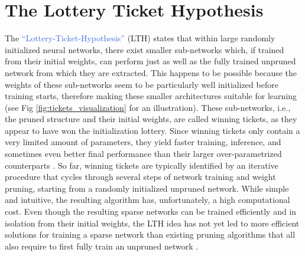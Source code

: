 \section{The Lottery Ticket Hypothesis}
\label{sec06:intro}
The \textcolor{RoyalBlue}{``Lottery-Ticket-Hypothesis''} (LTH) \cite{frankle2018lottery} states that within large randomly initialized neural networks, there exist smaller sub-networks which, if trained from their initial weights, can perform just as well as the fully trained unpruned network from which they are extracted. This happens to be possible because the weights of these sub-networks seem to be particularly well initialized before training starts, therefore making these smaller architectures suitable for learning (see Fig \ref{fig:tickets_visualization} for an illustration). These sub-networks, i.e., the pruned structure and their initial weights, are called winning tickets, as they appear to have won the initialization lottery. Since winning tickets only contain a very limited amount of parameters, they yield faster training, inference, and sometimes even better final performance than their larger over-parametrized counterparts \cite{frankle2018lottery,franklestabilizing}. So far, winning tickets are typically identified by an iterative procedure that cycles through several steps of network training and weight pruning, starting from a randomly initialized unpruned network. While simple and intuitive, the resulting algorithm has, unfortunately, a high computational cost. Even though the resulting sparse networks can be trained efficiently and in isolation from their initial weights, the LTH idea has not yet led to more efficient solutions for training a sparse network than existing pruning algorithms that all also require to first fully train an unpruned network \cite{han2015deep,molchanov2016pruning,dong2017learning,lin2017runtime,zhuang2018discrimination}.

